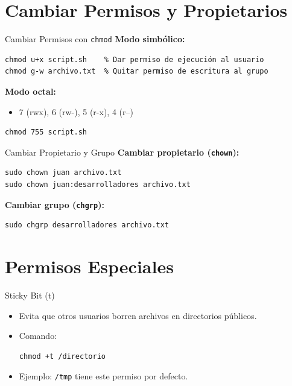 \documentclass{beamer}
\begin{document}
\section{Cambiar Permisos y Propietarios}

\begin{frame}[fragile]{Cambiar Permisos con \texttt{chmod}}
    \textbf{Modo simbólico:}
    \begin{lstlisting}
chmod u+x script.sh    % Dar permiso de ejecución al usuario
chmod g-w archivo.txt  % Quitar permiso de escritura al grupo
    \end{lstlisting}
    \vspace{0.3cm}
    \textbf{Modo octal:}
    \begin{itemize}
        \item 7 (rwx), 6 (rw-), 5 (r-x), 4 (r--)
    \end{itemize}
    \begin{lstlisting}
chmod 755 script.sh
    \end{lstlisting}
\end{frame}

\begin{frame}{Cambiar Propietario y Grupo}
    \textbf{Cambiar propietario (\texttt{chown}):}
    \begin{lstlisting}
sudo chown juan archivo.txt
sudo chown juan:desarrolladores archivo.txt
    \end{lstlisting}
    \vspace{0.3cm}
    \textbf{Cambiar grupo (\texttt{chgrp}):}
    \begin{lstlisting}
sudo chgrp desarrolladores archivo.txt
    \end{lstlisting}
\end{frame}

\section{Permisos Especiales}

\begin{frame}{Sticky Bit (t)}
    \begin{itemize}
        \item Evita que otros usuarios borren archivos en directorios públicos.
        \item Comando:
        \begin{lstlisting}
chmod +t /directorio
        \end{lstlisting}
        \item Ejemplo: \texttt{/tmp} tiene este permiso por defecto.
    \end{itemize}
\end{frame}
\end{document}
